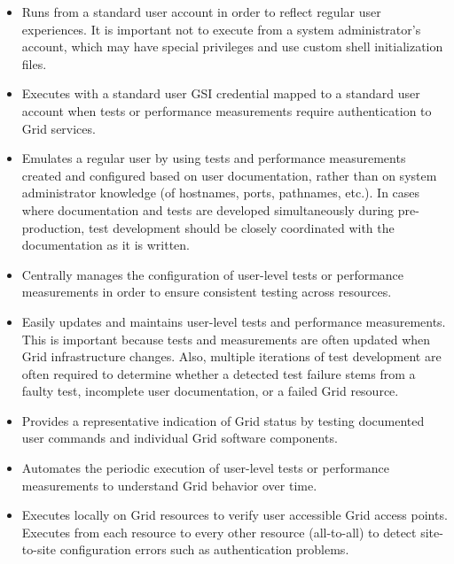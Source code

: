 \documentclass{sig-alternate}
\begin{document}
\begin{itemize}

\item Runs from a standard user
account in order to reflect regular user experiences.  It is important not to execute from a system administrator's account,
which may have special privileges and use custom shell initialization files.

\item Executes with a standard user GSI credential mapped to a standard user
account when tests or performance measurements require authentication to Grid
services.

\item Emulates a regular user by using tests and performance measurements
created and configured based on user
documentation, rather than on system administrator knowledge (of hostnames,
ports, pathnames, etc.).  In cases where documentation and tests are developed
simultaneously during pre-production, test development should
be closely coordinated with the documentation as it is written.

\item Centrally manages the configuration of user-level tests or performance
measurements in order to ensure consistent testing across resources.

\item Easily updates and maintains user-level tests and performance
measurements.  This is important because tests and measurements are often
updated when Grid infrastructure changes.
Also, multiple iterations of test development are often required to
determine whether a detected test failure stems from a faulty test,
incomplete user documentation, or a failed Grid resource.  

\item Provides a representative indication of Grid status by testing
documented user commands and individual Grid software components.  

\item Automates the periodic execution of user-level tests or performance
measurements to understand Grid behavior over time.

\item Executes locally on Grid resources to verify user accessible Grid access
points.  Executes from each resource to every other resource (all-to-all) to
detect site-to-site configuration errors such as authentication problems.

\end{itemize}
\end{document}
